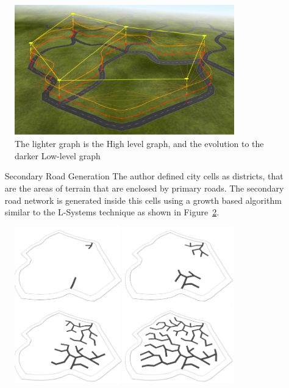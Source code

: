 \begin{figure}[htbp]
	\centering
	\includegraphics[width=0.85\textwidth]{img/CityGen/RoadGraphs.png}
	\caption{The lighter graph is the High level graph, and the evolution to the darker Low-level graph }
	\label{fig:graphs}
\end{figure}

\begin{itemize}
	\item[Secondary Road Generation] The author defined city cells as districts, that are the areas of terrain that are enclosed by primary roads. The secondary road network is generated inside this cells using a growth based algorithm similar to the L-Systems technique as shown in Figure~\ref{fig:graphs2}.
\end{itemize}


\begin{figure}[htbp]
	\centering
	\includegraphics[width=0.85\textwidth]{img/CityGen/SecondaryRoadGrowth.png}
	\caption{}
	\label{fig:graphs2}
\end{figure}


